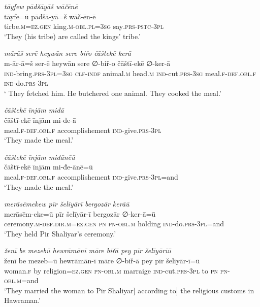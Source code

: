 \ea \label{ŽP.252}
\textit{tāyfew pādšāyāš wāčēnē} \\ 
\gll tāyfe=ū pādšā-yā=š wāč-ēn-ē \\ 
 tirbe\textsc{.m}\textsc{\textsc{=ez.gen}} king\textsc{.m}\textsc{-obl}\textsc{.pl}\textsc{=3sg} say\textsc{.prs-pstc-3pl} \\ 
\glt `They (his tribe) are called the kings’ tribe.'
\z 
 
\ea \label{ŽP.253}
\textit{mārāš serē heywān sere biřo čāštekē kerā} \\ 
\gll m-ār-ā=š ser-ē heywān sere ∅-biř-o čāštī-ekē ∅-ker-ā \\ 
 \textsc{ind-}bring\textsc{.prs}\textsc{-3pl}\textsc{=3sg} \textsc{clf}\textsc{-indf} animal\textsc{.m} head\textsc{.m} \textsc{ind-}cut\textsc{.prs}\textsc{-3sg} meal\textsc{.f}\textsc{-def}\textsc{.obl}\textsc{.f} \textsc{ind-}do\textsc{.prs}\textsc{-3pl} \\ 
\glt ` They fetched him. He butchered one animal. They cooked the meal.'
\z 
 
\ea \label{ŽP.254}
\textit{čāštekē īnjām miđā} \\ 
\gll čāštī-ekē īnjām mi-đe-ā \\ 
 meal\textsc{.f}\textsc{-def}\textsc{.obl}\textsc{.f} accomplishement \textsc{ind-}give\textsc{.prs}\textsc{-3pl} \\ 
\glt `They made the meal.'
\z 
 
\ea \label{ŽP.255}
\textit{čāštekē īnjām miđānēū} \\ 
\gll čāštī-ekē īnjām mi-đe-ānē=ū \\ 
 meal\textsc{.f}\textsc{-def}\textsc{.obl}\textsc{.f} accomplishement \textsc{ind-}give\textsc{.prs}\textsc{-3pl}=and \\ 
\glt `They made the meal.'
\z 
 
\ea \label{ŽP.256}
\textit{merāsēmekew pīr šelīyārī bergozār kerāū} \\ 
\gll merāsēm-eke=ū pīr šelīyār-ī bergozār ∅-ker-ā=ū \\ 
 ceremony\textsc{.m}\textsc{-def}\textsc{.dir}\textsc{.m}\textsc{\textsc{=ez.gen}} \textsc{pn} \textsc{pn}\textsc{-obl}\textsc{.m} holding \textsc{ind-}do\textsc{.prs}\textsc{-3pl}=and \\ 
\glt `They held Pir Shaliyar’s ceremony.'
\z 
 
\ea \label{ŽP.257}
\textit{ženī be mezebū hewrāmānī māre biřā pey pīr šelīyārīū} \\ 
\gll ženī be mezeb=ū hewrāmān-ī māre ∅-biř-ā pey pīr šelīyār-ī=ū \\ 
 woman\textsc{.f} by religion\textsc{\textsc{=ez.gen}} \textsc{pn}\textsc{-obl}\textsc{.m} marraige \textsc{ind-}cut\textsc{.prs}\textsc{-3pl} to \textsc{pn} \textsc{pn}\textsc{-obl}\textsc{.m}=and \\ 
\glt `They married the woman to Pir Shaliyar] according to] the religious customs in Hawraman.'
\z 
 
